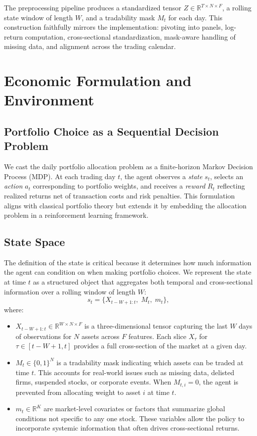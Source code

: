 \documentclass[10pt,leqno]{amsart}
\begin{document}
The preprocessing pipeline produces a standardized tensor $Z \in \mathbb{R}^{T \times N \times F}$, a rolling state window of length $W$, and a tradability mask $M_t$ for each day. This construction faithfully mirrors the implementation: pivoting into panels, log-return computation, cross-sectional standardization, mask-aware handling of missing data, and alignment across the trading calendar.
\section{Economic Formulation and Environment}

\subsection{Portfolio Choice as a Sequential Decision Problem}
We cast the daily portfolio allocation problem as a finite-horizon Markov Decision Process (MDP). At each trading day $t$, the agent observes a \emph{state} $s_t$, selects an \emph{action} $a_t$ corresponding to portfolio weights, and receives a \emph{reward} $R_t$ reflecting realized returns net of transaction costs and risk penalties. This formulation aligns with classical portfolio theory \citep{markowitz1952portfolio} but extends it by embedding the allocation problem in a reinforcement learning framework.

\subsection{State Space}

The definition of the state is critical because it determines how much information the agent can condition on when making portfolio choices. We represent the state at time $t$ as a structured object that aggregates both temporal and cross-sectional information over a rolling window of length $W$:
\[
s_t = \{ X_{t-W+1:t}, \; M_t, \; m_t \},
\]
where:
\begin{itemize}
    \item $X_{t-W+1:t} \in \mathbb{R}^{W \times N \times F}$ is a three-dimensional tensor capturing the last $W$ days of observations for $N$ assets across $F$ features. Each slice $X_{\tau}$ for $\tau \in [t-W+1,t]$ provides a full cross-section of the market at a given day.
    \item $M_t \in \{0,1\}^N$ is a tradability mask indicating which assets can be traded at time $t$. This accounts for real-world issues such as missing data, delisted firms, suspended stocks, or corporate events. When $M_{t,i}=0$, the agent is prevented from allocating weight to asset $i$ at time $t$.
    \item $m_t \in \mathbb{R}^K$ are market-level covariates or factors that summarize global conditions not specific to any one stock. These variables allow the policy to incorporate systemic information that often drives cross-sectional returns.
\end{itemize}
\end{document}
